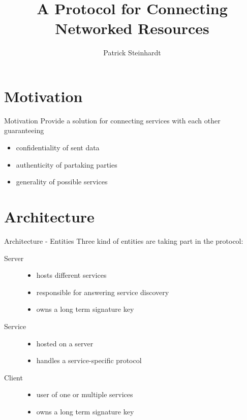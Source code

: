\documentclass[a4paper]{beamer}
\author{Patrick Steinhardt}
\title{A Protocol for Connecting Networked Resources}
\institute{Freie Universität Berlin}
\begin{document}
\begin{frame}[plain]
    \maketitle
\end{frame}

\begin{frame}
    \tableofcontents
\end{frame}

\section{Motivation}

\begin{frame}{Motivation}
    Provide a solution for connecting services with each other  guaranteeing
    \begin{itemize}
        \item confidentiality of sent data
        \item authenticity of partaking parties
        \item generality of possible services
    \end{itemize}
\end{frame}

\section{Architecture}

\begin{frame}{Architecture - Entities}
    Three kind of entities are taking part in the protocol:

    \begin{description}
        \item[Server]
            \begin{itemize}
                \item hosts different services
                \item responsible for answering service discovery
                \item owns a long term signature key
            \end{itemize}
        \item[Service]
            \begin{itemize}
                \item hosted on a server
                \item handles a service-specific protocol
            \end{itemize}
        \item[Client]
            \begin{itemize}
                \item user of one or multiple services
                \item owns a long term signature key
            \end{itemize}
    \end{description}
\end{frame}
\end{document}
